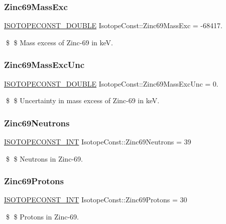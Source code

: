 \subsubsection{\texorpdfstring{Zinc69\+Mass\+Exc}{Zinc69MassExc}}
{\footnotesize\ttfamily \mbox{\hyperlink{group___isotope_const-_macros_ga8f45a7272ce02c0b4c65c44636ed719a}{I\+S\+O\+T\+O\+P\+E\+C\+O\+N\+S\+T\+\_\+\+D\+O\+U\+B\+LE}} Isotope\+Const\+::\+Zinc69\+Mass\+Exc = -\/68417.}

\$ \$ Mass excess of Zinc-\/69 in keV. \mbox{\label{group___isotope_const-_zinc-_zn69_ga9a9d50701162b04404b026370a04463c}} 
\subsubsection{\texorpdfstring{Zinc69\+Mass\+Exc\+Unc}{Zinc69MassExcUnc}}
{\footnotesize\ttfamily \mbox{\hyperlink{group___isotope_const-_macros_ga8f45a7272ce02c0b4c65c44636ed719a}{I\+S\+O\+T\+O\+P\+E\+C\+O\+N\+S\+T\+\_\+\+D\+O\+U\+B\+LE}} Isotope\+Const\+::\+Zinc69\+Mass\+Exc\+Unc = 0.}

\$ \$ Uncertainty in mass excess of Zinc-\/69 in keV. \mbox{\label{group___isotope_const-_zinc-_zn69_gabe0135b0b08cf3c46c0b88d3bc687e3c}} 
\subsubsection{\texorpdfstring{Zinc69\+Neutrons}{Zinc69Neutrons}}
{\footnotesize\ttfamily \mbox{\hyperlink{group___isotope_const-_macros_ga5f18360b3e99483a35c32d789e62621c}{I\+S\+O\+T\+O\+P\+E\+C\+O\+N\+S\+T\+\_\+\+I\+NT}} Isotope\+Const\+::\+Zinc69\+Neutrons = 39}

\$ \$ Neutrons in Zinc-\/69. \mbox{\label{group___isotope_const-_zinc-_zn69_ga07bf9a87f4a5e048b411bdb669029353}} 
\subsubsection{\texorpdfstring{Zinc69\+Protons}{Zinc69Protons}}
{\footnotesize\ttfamily \mbox{\hyperlink{group___isotope_const-_macros_ga5f18360b3e99483a35c32d789e62621c}{I\+S\+O\+T\+O\+P\+E\+C\+O\+N\+S\+T\+\_\+\+I\+NT}} Isotope\+Const\+::\+Zinc69\+Protons = 30}

\$ \$ Protons in Zinc-\/69. 